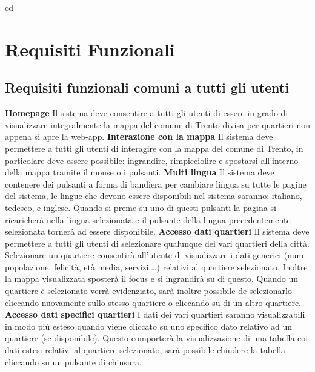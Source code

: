cd\chapter{Requisiti Funzionali} 
    \section{Requisiti funzionali comuni a tutti gli utenti}
        \begin{rfList}
            \rfItem \textbf{Homepage} Il sistema deve consentire a tutti gli utenti di essere in grado di visualizzare integralmente la mappa del comune di Trento divisa per quartieri non appena si apre la web-app.
            \rfItem \textbf{Interazione con la mappa} Il sistema deve permettere a tutti gli utenti di interagire con la mappa del comune di Trento, in particolare deve essere possibile: ingrandire, rimpicciolire e spostarsi all'interno della mappa tramite il mouse o i pulsanti.
            \rfItem \textbf{Multi lingua} Il sistema deve contenere dei pulsanti a forma di bandiera per cambiare lingua su tutte le pagine del sistema, le lingue che devono essere disponibili nel sistema saranno: italiano, tedesco, e inglese. Quando si preme su uno di questi pulsanti la pagina si ricaricherà nella lingua selezionata e il pulsante della lingua precedentemente selezionata tornerà ad essere disponibile.
            \rfItem \textbf{Accesso dati quartieri} Il sistema deve permettere a tutti gli utenti di selezionare qualunque dei vari quartieri della città. Selezionare un quartiere consentirà all'utente di visualizzare i dati generici (num popolazione, felicità, età media, servizi,\dots) relativi al quartiere selezionato. Inoltre la mappa visualizzata sposterà il focus e si ingrandirà su di questo. Quando un quartiere è selezionato verrà evidenziato, sarà inoltre possibile de-selezionarlo cliccando nuovamente sullo stesso quartiere o cliccando su di un altro quartiere.
            \rfItem \textbf{Accesso dati specifici quartieri} I dati dei vari quartieri saranno visualizzabili in modo più esteso quando viene cliccato su uno specifico dato relativo ad un quartiere (se disponibile). Questo comporterà la visualizzazione di una tabella coi dati estesi relativi al quartiere selezionato, sarà possibile chiudere la tabella cliccando su un pulsante di chiusura. 
        \end{rfList} 
